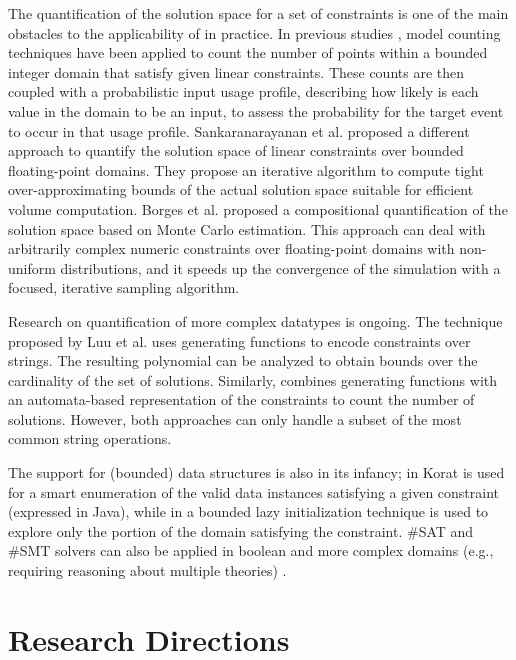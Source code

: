 \documentclass[10pt]{article}
\newcounter{list}
\begin{document}
The quantification of the solution space for a set of constraints is
one of the main obstacles to the applicability of \PSE{} in practice.
In previous studies \cite{filieri2013reliability,
  geldenhuys2012probabilistic}, model counting techniques have been
applied to count the number of points within a bounded integer domain
that satisfy given linear constraints.  These counts are then coupled
with a probabilistic input usage profile, describing how likely is
each value in the domain to be an input, to assess the probability for
the target event to occur in that usage profile. Sankaranarayanan et
al. \cite{sankaranarayanan2013static} proposed a different approach to
quantify the solution space of linear constraints over bounded
floating-point domains. They propose an iterative algorithm to compute
tight over-approximating bounds of the actual solution space suitable
for efficient volume computation.  Borges et
al. \cite{borges2014compositional,borges2015iterative} proposed a
compositional quantification of the solution space based on Monte
Carlo estimation. This approach can deal with arbitrarily complex
numeric constraints over floating-point domains with non-uniform
distributions, and it speeds up the convergence of the simulation with
a focused, iterative sampling algorithm.

Research on quantification of more complex datatypes is ongoing. The
technique proposed by Luu et al. \cite{luu2014model} uses generating
functions to encode constraints over strings. The resulting polynomial
can be analyzed to obtain bounds over the cardinality of the set of
solutions. Similarly, \cite{aydin2015automata} combines generating
functions with an automata-based representation of the constraints to
count the number of solutions. However, both approaches can only
handle a subset of the most common string operations.

The support for (bounded) data structures is also in its infancy; in
\cite{filieri2013reliability} Korat is used for a smart enumeration of
the valid data instances satisfying a given constraint (expressed in
Java), while in \cite{filieri2015model} a bounded lazy initialization technique is
used to explore only the portion of the domain satisfying the
constraint. \#SAT and \#SMT solvers can also be applied in boolean and
more complex domains (e.g., requiring reasoning about multiple
theories) \cite{biere2009handbook}.

\section{Research Directions}
\label{research}
\end{document}
